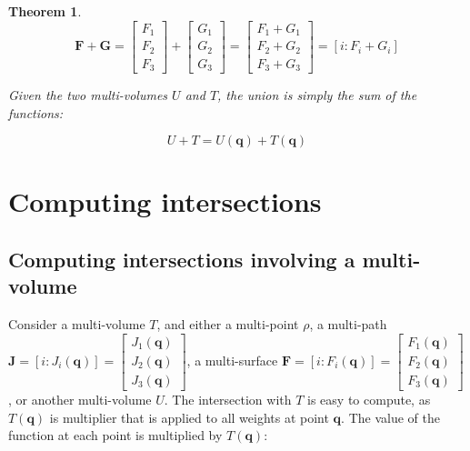 \documentclass{book}
\newtheorem{thm}{Theorem}
\begin{document}
\begin{thm}
\[\mathbf{F} + \mathbf{G} = \begin{bmatrix} F_1 \\ F_2 \\ F_3 \end{bmatrix} + \begin{bmatrix} G_1 \\ G_2 \\ G_3 \end{bmatrix} = \begin{bmatrix} F_1 + G_1 \\ F_2 + G_2 \\ F_3 + G_3 \end{bmatrix} = [i : F_i + G_i]\]


Given the two multi-volumes \(U\) and \(T\), the union is simply the sum of the functions:

\[U + T = U(\mathbf{q}) + T(\mathbf{q})\]
\end{thm}



\section{Computing intersections}

\subsection*{Computing intersections involving a multi-volume}

Consider a multi-volume \(T\), and either a multi-point \(\rho\), a multi-path \(\mathbf{J} = [i : J_i(\mathbf{q})] = \begin{bmatrix} J_1(\mathbf{q}) \\ J_2(\mathbf{q}) \\ J_3(\mathbf{q}) \end{bmatrix}\), a multi-surface \(\mathbf{F} = [i : F_i(\mathbf{q})] = \begin{bmatrix} F_1(\mathbf{q}) \\ F_2(\mathbf{q}) \\ F_3(\mathbf{q}) \end{bmatrix}\), or another multi-volume \(U\). The intersection with \(T\) is easy to compute, as \(T(\mathbf{q})\) is multiplier that is applied to all weights at point \(\mathbf{q}\). The value of the function at each point is multiplied by \(T(\mathbf{q})\):
\end{document}

